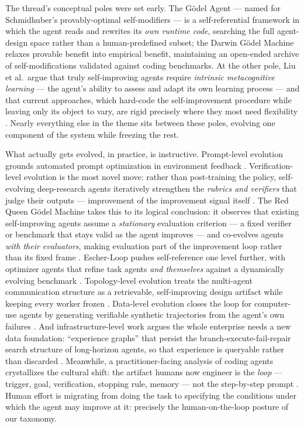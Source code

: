 \documentclass[
  11pt,
]{article}
\begin{document}
The thread's conceptual poles were set early. The Gödel Agent
\citep{yin2024g} --- named for Schmidhuber's provably-optimal
self-modifiers \citep{schmidhuber2003godel} --- is a self-referential
framework in which the agent reads and rewrites its \emph{own runtime
code}, searching the full agent-design space rather than a
human-predefined subset; the Darwin Gödel Machine \citep{zhang2025dgm}
relaxes provable benefit into empirical benefit, maintaining an
open-ended archive of self-modifications validated against coding
benchmarks. At the other pole, Liu et al.~argue that truly
self-improving agents require \emph{intrinsic metacognitive learning}
--- the agent's ability to assess and adapt its own learning process ---
and that current approaches, which hard-code the self-improvement
procedure while leaving only its object to vary, are rigid precisely
where they most need flexibility \citep{liu2025truly}. Nearly everything
else in the theme sits between these poles, evolving one component of
the system while freezing the rest.

What actually gets evolved, in practice, is instructive. Prompt-level
evolution grounds automated prompt optimization in environment feedback
\citep{fernandes2026environment}. Verification-level evolution is the
most novel move: rather than post-training the policy, self-evolving
deep-research agents iteratively strengthen the \emph{rubrics and
verifiers} that judge their outputs --- improvement of the improvement
signal itself \citep{wan2026inference}. The Red Queen Gödel Machine
takes this to its logical conclusion: it observes that existing
self-improving agents assume a \emph{stationary} evaluation criterion
--- a fixed verifier or benchmark that stays valid as the agent improves
--- and co-evolves agents \emph{with their evaluators}, making
evaluation part of the improvement loop rather than its fixed frame
\citep{iacob2026red}. Escher-Loop pushes self-reference one level
further, with optimizer agents that refine task agents \emph{and
themselves} against a dynamically evolving benchmark
\citep{liu2026escher}. Topology-level evolution treats the multi-agent
communication structure as a retrievable, self-improving design artifact
while keeping every worker frozen \citep{tian2026queenbee}. Data-level
evolution closes the loop for computer-use agents by generating
verifiable synthetic trajectories from the agent's own failures
\citep{sun2026learning}. And infrastructure-level work argues the whole
enterprise needs a new data foundation: ``experience graphs'' that
persist the branch-execute-fail-repair search structure of long-horizon
agents, so that experience is queryable rather than discarded
\citep{liao2026experience}. Meanwhile, a practitioner-facing analysis of
coding agents crystallizes the cultural shift: the artifact humans now
engineer is the \emph{loop} --- trigger, goal, verification, stopping
rule, memory --- not the step-by-step prompt \citep{macedo2026stop}.
Human effort is migrating from doing the task to specifying the
conditions under which the agent may improve at it: precisely the
human-on-the-loop posture of our taxonomy.
\end{document}
